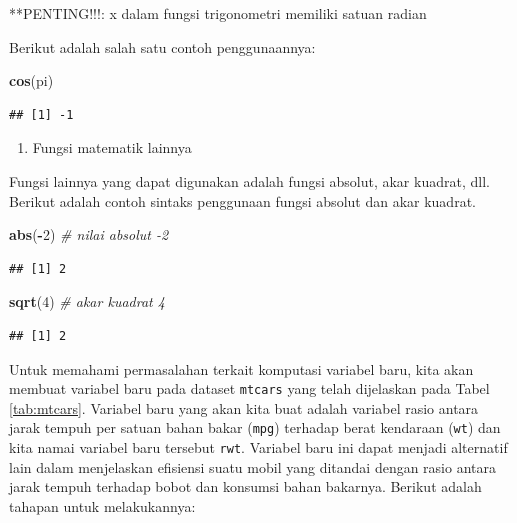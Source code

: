 \documentclass[12pt,]{krantz}
\newenvironment{Shaded}{\begin{snugshade}}{\end{snugshade}}
\newcommand{\CommentTok}[1]{\textcolor[rgb]{0.56,0.35,0.01}{\textit{#1}}}
\newcommand{\DecValTok}[1]{\textcolor[rgb]{0.00,0.00,0.81}{#1}}
\newcommand{\KeywordTok}[1]{\textcolor[rgb]{0.13,0.29,0.53}{\textbf{#1}}}
\newcommand{\NormalTok}[1]{#1}
\newcommand{\OperatorTok}[1]{\textcolor[rgb]{0.81,0.36,0.00}{\textbf{#1}}}
\providecommand{\tightlist}{%
  \setlength{\itemsep}{0pt}\setlength{\parskip}{0pt}}
\renewenvironment{quote}{\begin{VF}}{\end{VF}}
\begin{document}
\begin{quote}
**PENTING!!!: x dalam fungsi trigonometri memiliki satuan radian
\end{quote}

Berikut adalah salah satu contoh penggunaannya:

\begin{Shaded}
\begin{Highlighting}[]
\KeywordTok{cos}\NormalTok{(pi)}
\end{Highlighting}
\end{Shaded}

\begin{verbatim}
## [1] -1
\end{verbatim}

\begin{enumerate}
\def\labelenumi{\arabic{enumi}.}
\setcounter{enumi}{2}
\tightlist
\item
  Fungsi matematik lainnya
\end{enumerate}

Fungsi lainnya yang dapat digunakan adalah fungsi absolut, akar kuadrat, dll. Berikut adalah contoh sintaks penggunaan fungsi absolut dan akar kuadrat.

\begin{Shaded}
\begin{Highlighting}[]
\KeywordTok{abs}\NormalTok{(}\OperatorTok{-}\DecValTok{2}\NormalTok{) }\CommentTok{# nilai absolut -2}
\end{Highlighting}
\end{Shaded}

\begin{verbatim}
## [1] 2
\end{verbatim}

\begin{Shaded}
\begin{Highlighting}[]
\KeywordTok{sqrt}\NormalTok{(}\DecValTok{4}\NormalTok{) }\CommentTok{# akar kuadrat 4}
\end{Highlighting}
\end{Shaded}

\begin{verbatim}
## [1] 2
\end{verbatim}

Untuk memahami permasalahan terkait komputasi variabel baru, kita akan membuat variabel baru pada dataset \texttt{mtcars} yang telah dijelaskan pada Tabel \ref{tab:mtcars}. Variabel baru yang akan kita buat adalah variabel rasio antara jarak tempuh per satuan bahan bakar (\texttt{mpg}) terhadap berat kendaraan (\texttt{wt}) dan kita namai variabel baru tersebut \texttt{rwt}. Variabel baru ini dapat menjadi alternatif lain dalam menjelaskan efisiensi suatu mobil yang ditandai dengan rasio antara jarak tempuh terhadap bobot dan konsumsi bahan bakarnya. Berikut adalah tahapan untuk melakukannya:
\end{document}
